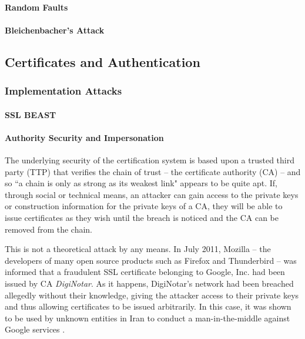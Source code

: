       \paragraph{Random Faults}
      \paragraph{Bleichenbacher's Attack}
  
  \subsection{Certificates and Authentication}
  
    \subsubsection{Implementation Attacks}
    
      \paragraph{SSL BEAST}
    
      \paragraph{Authority Security and Impersonation}
      
        The underlying security of the certification system is based upon a trusted third party (TTP) that verifies the chain of trust -- the certificate authority (CA) -- and so ``a chain is only as strong as its weakest link" appears to be quite apt. If, through social or technical means, an attacker can gain access to the private keys or construction information for the private keys of a CA, they will be able to issue certificates as they wish until the breach is noticed and the CA can be removed from the chain.
    
        This is not a theoretical attack by any means. In July 2011, Mozilla -- the developers of many open source products such as Firefox and Thunderbird -- was informed that a fraudulent SSL certificate belonging to Google, Inc. had been issued by CA \emph{DigiNotar}. As it happens, DigiNotar's network had been breached allegedly without their knowledge, giving the attacker access to their private keys and thus allowing certificates to be issued arbitrarily. In this case, it was shown to be used by unknown entities in Iran to conduct a man-in-the-middle against Google services \cite{Google:2011ah}.

